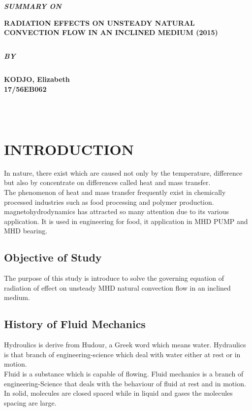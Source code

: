\documentclass[12pt]{report}
\newcommand{\sps}{\\[0.2cm]}
\begin{document}
	\begin{titlepage}
		\begin{center}
			\textbf{\itshape SUMMARY ON}
		\end{center} 
		\begin{center}
			{\bf \Large RADIATION EFFECTS ON UNSTEADY NATURAL CONVECTION FLOW IN AN INCLINED MEDIUM (2015)}
		\end{center}
		$$$$
		\vspace{3cm}
		\begin{center}
			\textbf{\itshape BY}
		\end{center} 
		$$$$
		\vspace{2cm}
		\begin{center}
			{\bf KODJO, Elizabeth\\
				17/56EB062}
		\end{center}
		$$$$
		\\ \\
	\end{titlepage}
	
	\chapter{INTRODUCTION}
	In nature, there exist which are caused not only by the temperature, difference but also by concentrate on differences called heat and mass transfer.\sps
	The phenomenon of heat and mass transfer frequently exist in chemically processed industries such as food processing and polymer production.\sps
	magnetohydrodynamics has attracted so many attention due to its various application. It is used in engineering for food, it application in MHD PUMP and MHD bearing.
	
	\section{Objective of Study}
	The purpose of this study is introduce to solve the governing equation of radiation of effect on unsteady MHD natural convection flow in an inclined medium.
	
	\section{History of Fluid Mechanics}
	Hydroulics is derive from Hudour, a Greek word which means water. Hydraulics is that branch of engineering-science which deal with water either at rest or in motion.\sps
	Fluid is a substance which is capable of flowing. Fluid mechanics is a branch of engineering-Science that deals with the behaviour of fluid at rest and in motion. In solid, molecules are closed spaced while in liquid and gases the molecules spacing are large.\\
	
\end{document}
